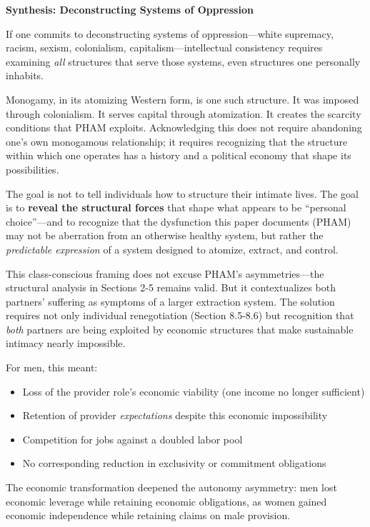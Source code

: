 \documentclass[12pt,openany]{book}
\numberwithin{equation}{chapter}
\begin{document}
\textbf{Synthesis: Deconstructing Systems of Oppression}

If one commits to deconstructing systems of oppression---white supremacy, racism, sexism, colonialism, capitalism---intellectual consistency requires examining \textit{all} structures that serve those systems, even structures one personally inhabits.

Monogamy, in its atomizing Western form, is one such structure. It was imposed through colonialism. It serves capital through atomization. It creates the scarcity conditions that PHAM exploits. Acknowledging this does not require abandoning one's own monogamous relationship; it requires recognizing that the structure within which one operates has a history and a political economy that shape its possibilities.

The goal is not to tell individuals how to structure their intimate lives. The goal is to \textbf{reveal the structural forces} that shape what appears to be ``personal choice''---and to recognize that the dysfunction this paper documents (PHAM) may not be aberration from an otherwise healthy system, but rather the \textit{predictable expression} of a system designed to atomize, extract, and control.

This class-conscious framing does not excuse PHAM's asymmetries---the structural analysis in Sections 2-5 remains valid. But it contextualizes both partners' suffering as symptoms of a larger extraction system. The solution requires not only individual renegotiation (Section 8.5-8.6) but recognition that \textit{both} partners are being exploited by economic structures that make sustainable intimacy nearly impossible.

For men, this meant:
\begin{itemize}
    \item Loss of the provider role's economic viability (one income no longer sufficient)
    \item Retention of provider \textit{expectations} despite this economic impossibility
    \item Competition for jobs against a doubled labor pool
    \item No corresponding reduction in exclusivity or commitment obligations
\end{itemize}

The economic transformation deepened the autonomy asymmetry: men lost economic leverage while retaining economic obligations, as women gained economic independence while retaining claims on male provision.
\end{document}

